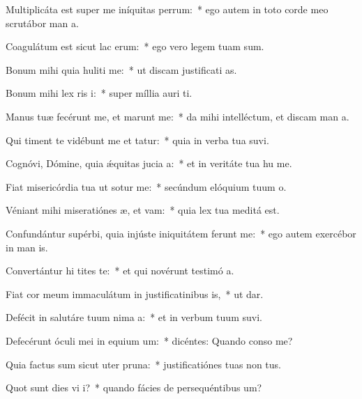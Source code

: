 \item Multiplicáta est super me iníquitas perrum:~* ego autem in toto corde meo scrutábor man a.
\item Coagulátum est sicut lac  erum:~* ego vero legem tuam  sum.
\item Bonum mihi quia huliti me:~* ut discam justificati as.
\item Bonum mihi lex ris i:~* super míllia auri  ti.
\item Manus tuæ fecérunt me, et marunt me:~* da mihi intelléctum, et discam man a.
\item Qui timent te vidébunt me et tatur:~* quia in verba tua suvi.
\item Cognóvi, Dómine, quia ǽquitas jucia a:~* et in veritáte tua hu me.
\item Fiat misericórdia tua ut sotur me:~* secúndum elóquium tuum  o.
\item Véniant mihi miseratiónes æ, et vam:~* quia lex tua meditá  est.
\item Confundántur supérbi, quia injúste iniquitátem ferunt  me:~* ego autem exercébor in man is.
\item Convertántur hi tites te:~* et qui novérunt testimó a.
\item Fiat cor meum immaculátum in justificatinibus is,~* ut  dar.
\item Defécit in salutáre tuum nima a:~* et in verbum tuum suvi.
\item Defecérunt óculi mei in equium um:~* dicéntes: Quando conso me?
\item Quia factus sum sicut uter  pruna:~* justificatiónes tuas non  tus.
\item Quot sunt dies vi i?~* quando fácies de persequéntibus  um?
